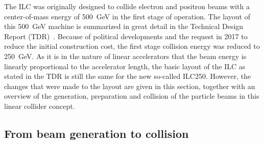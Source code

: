 The ILC was originally designed to collide electron and positron beams with a center-of-mass energy of \SI{500}{\GeV} in the first stage of operation.
The layout of this \SI{500}{\GeV} machine is summarized in great detail in the Technical Design Report (TDR)~\cite{TDR}.
Because of political developments and the request in 2017 to reduce the initial construction cost, the first stage collision energy was reduced to \SI{250}{\GeV}.
As it is in the nature of linear accelerators that the beam energy is linearly proportional to the accelerator length, the basic layout of the ILC as stated in the TDR is still the same for the new so-called ILC250.
However, the changes that were made to the layout are given in this section, together with an overview of the generation, preparation and collision of the particle beams in this linear collider concept.

\subsection{From beam generation to collision}
\label{ILC:layout:details}
